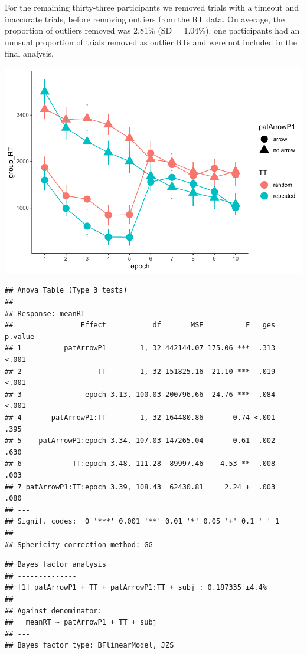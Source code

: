 \documentclass[
  man]{apa6}
\begin{document}
For the remaining thirty-three participants we removed trials with a timeout and inaccurate trials, before removing outliers from the RT data. On average, the proportion of outliers removed was 2.81\% (SD = 1.04\%). one participants had an unusual proportion of trials removed as outlier RTs and were not included in the final analysis.

\includegraphics{CCC_ms1_files/figure-latex/unnamed-chunk-11-1.pdf}

\begin{verbatim}
## Anova Table (Type 3 tests)
## 
## Response: meanRT
##                Effect           df       MSE          F   ges p.value
## 1          patArrowP1        1, 32 442144.07 175.06 ***  .313   <.001
## 2                  TT        1, 32 151825.16  21.10 ***  .019   <.001
## 3               epoch 3.13, 100.03 200796.66  24.76 ***  .084   <.001
## 4       patArrowP1:TT        1, 32 164480.86       0.74 <.001    .395
## 5    patArrowP1:epoch 3.34, 107.03 147265.04       0.61  .002    .630
## 6            TT:epoch 3.48, 111.28  89997.46    4.53 **  .008    .003
## 7 patArrowP1:TT:epoch 3.39, 108.43  62430.81     2.24 +  .003    .080
## ---
## Signif. codes:  0 '***' 0.001 '**' 0.01 '*' 0.05 '+' 0.1 ' ' 1
## 
## Sphericity correction method: GG
\end{verbatim}

\begin{verbatim}
## Bayes factor analysis
## --------------
## [1] patArrowP1 + TT + patArrowP1:TT + subj : 0.187335 ±4.4%
## 
## Against denominator:
##   meanRT ~ patArrowP1 + TT + subj 
## ---
## Bayes factor type: BFlinearModel, JZS
\end{verbatim}
\end{document}
